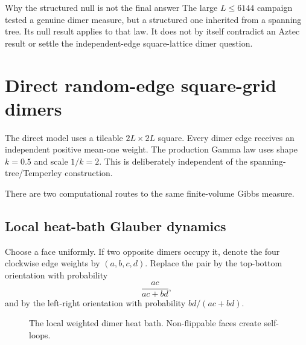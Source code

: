 \documentclass[11pt,a4paper,oneside,openany]{memoir}
\newcommand{\1}{\bm{1}}
\begin{document}
\begin{warningbox}{Why the structured null is not the final answer}
The large $L\leq6144$ campaign tested a genuine dimer measure, but a structured
one inherited from a spanning tree. Its null result applies to that law. It
does not by itself contradict an Aztec result or settle the independent-edge
square-lattice dimer question.
\end{warningbox}

\section{Direct random-edge square-grid dimers}

The direct model uses a tileable $2L\times2L$ square. Every dimer edge receives
an independent positive mean-one weight. The production Gamma law uses shape
$k=0.5$ and scale $1/k=2$. This is deliberately independent of the
spanning-tree/Temperley construction.

There are two computational routes to the same finite-volume Gibbs measure.

\subsection{Local heat-bath Glauber dynamics}

Choose a face uniformly. If two opposite dimers occupy it, denote the four
clockwise edge weights by $(a,b,c,d)$. Replace the pair by the top-bottom
orientation with probability
\[
  \frac{ac}{ac+bd},
\]
and by the left-right orientation with probability $bd/(ac+bd)$.

\begin{figure}[H]
\centering
{}
\caption{The local weighted dimer heat bath. Non-flippable faces create self-loops.}
\end{figure}
\end{document}
